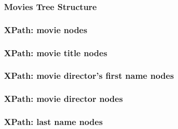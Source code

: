 \documentclass[12pt]{beamer}\usepackage[]{graphicx}\usepackage[]{color}
\begin{document}

\begin{frame}
\frametitle{Movies Tree Structure}
\begin{center}
\end{center}
\end{frame}


\begin{frame}
\frametitle{XPath: movie nodes}
\begin{center}
\end{center}
\end{frame}


\begin{frame}
\frametitle{XPath: movie title nodes}
\begin{center}
\end{center}
\end{frame}


\begin{frame}
\frametitle{XPath: movie director's first name nodes}
\begin{center}
\end{center}
\end{frame}


\begin{frame}
\frametitle{XPath: movie director nodes}
\begin{center}
\end{center}
\end{frame}


\begin{frame}
\frametitle{XPath: last name nodes}
\begin{center}
\end{center}
\end{frame}

\end{document}
